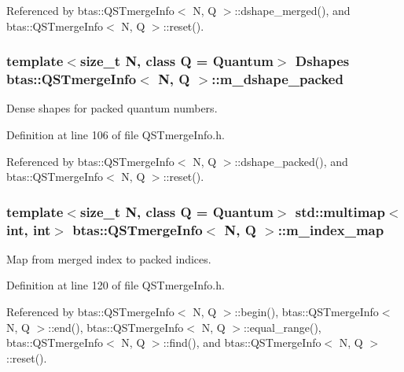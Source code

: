 Referenced by btas\-::\-Q\-S\-Tmerge\-Info$<$ N, Q $>$\-::dshape\-\_\-merged(), and btas\-::\-Q\-S\-Tmerge\-Info$<$ N, Q $>$\-::reset().

\subsubsection[{m\-\_\-dshape\-\_\-packed}]{\setlength{\rightskip}{0pt plus 5cm}template$<$size\-\_\-t N, class Q = Quantum$>$ {\bf Dshapes} {\bf btas\-::\-Q\-S\-Tmerge\-Info}$<$ N, Q $>$\-::m\-\_\-dshape\-\_\-packed\hspace{0.3cm}{\ttfamily [private]}}\label{d0/de7/classbtas_1_1QSTmergeInfo_a6bfc51c02847f015110497e3e5cd05e4}


Dense shapes for packed quantum numbers. 



Definition at line 106 of file Q\-S\-Tmerge\-Info.\-h.



Referenced by btas\-::\-Q\-S\-Tmerge\-Info$<$ N, Q $>$\-::dshape\-\_\-packed(), and btas\-::\-Q\-S\-Tmerge\-Info$<$ N, Q $>$\-::reset().

\subsubsection[{m\-\_\-index\-\_\-map}]{\setlength{\rightskip}{0pt plus 5cm}template$<$size\-\_\-t N, class Q = Quantum$>$ std\-::multimap$<$int, int$>$ {\bf btas\-::\-Q\-S\-Tmerge\-Info}$<$ N, Q $>$\-::m\-\_\-index\-\_\-map\hspace{0.3cm}{\ttfamily [private]}}\label{d0/de7/classbtas_1_1QSTmergeInfo_a08e318c51bf314e41486599b0d6ba7dd}


Map from merged index to packed indices. 



Definition at line 120 of file Q\-S\-Tmerge\-Info.\-h.



Referenced by btas\-::\-Q\-S\-Tmerge\-Info$<$ N, Q $>$\-::begin(), btas\-::\-Q\-S\-Tmerge\-Info$<$ N, Q $>$\-::end(), btas\-::\-Q\-S\-Tmerge\-Info$<$ N, Q $>$\-::equal\-\_\-range(), btas\-::\-Q\-S\-Tmerge\-Info$<$ N, Q $>$\-::find(), and btas\-::\-Q\-S\-Tmerge\-Info$<$ N, Q $>$\-::reset().

